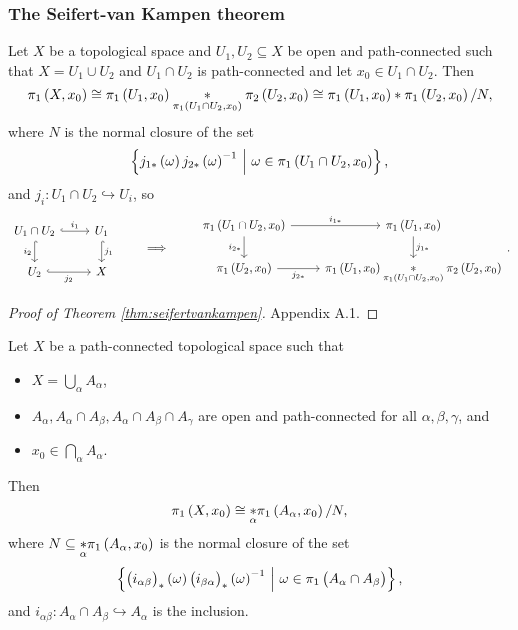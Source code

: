 \pagebreak

\subsubsection{The Seifert-van Kampen theorem}

\begin{theorem}
\label{thm:seifertvankampen}
Let $ X $ be a topological space and $ U_1, U_2 \subseteq X $ be open and path-connected such that $ X = U_1 \cup U_2 $ and $ U_1 \cap U_2 $ is path-connected and let $ x_0 \in U_1 \cap U_2 $. Then
$$ \pi_1\br{X, x_0} \cong \pi_1\br{U_1, x_0} \underset{\pi_1\br{U_1 \cap U_2, x_0}}{*} \pi_2\br{U_2, x_0} \cong \pi_1\br{U_1, x_0} * \pi_1\br{U_2, x_0} / N, $$
where $ N $ is the normal closure of the set
$$ \cbr{j_{1*}\br{\omega}j_{2*}\br{\omega}^{-1} \st \omega \in \pi_1\br{U_1 \cap U_2, x_0}}, $$
and $ j_i : U_1 \cap U_2 \hookrightarrow U_i $, so
$$
\begin{tikzcd}
U_1 \cap U_2 \arrow[hookrightarrow]{r}{i_1} \arrow[hookrightarrow]{d}[swap]{i_2} & U_1 \arrow[hookrightarrow]{d}{j_1} \\
U_2 \arrow[hookrightarrow]{r}[swap]{j_2} & X
\end{tikzcd}
\qquad \implies \qquad
\begin{tikzcd}
\pi_1\br{U_1 \cap U_2, x_0} \arrow{r}{i_{1*}} \arrow{d}[swap]{i_{2*}} & \pi_1\br{U_1, x_0} \arrow{d}{j_{1*}} \\
\pi_1\br{U_2, x_0} \arrow{r}[swap]{j_{2*}} & \pi_1\br{U_1, x_0} \underset{\pi_1\br{U_1 \cap U_2, x_0}}{*} \pi_2\br{U_2, x_0}
\end{tikzcd}.
$$
\end{theorem}

\begin{proof}[Proof of Theorem \ref{thm:seifertvankampen}]
Appendix A.1.
\end{proof}


\begin{theorem}
Let $ X $ be a path-connected topological space such that
\begin{itemize}
\item $ X = \bigcup_\alpha A_\alpha $,
\item $ A_\alpha, A_\alpha \cap A_\beta, A_\alpha \cap A_\beta \cap A_\gamma $ are open and path-connected for all $ \alpha, \beta, \gamma $, and
\item $ x_0 \in \bigcap_\alpha A_\alpha $.
\end{itemize}
Then
$$ \pi_1\br{X, x_0} \cong \underset{\alpha}{*} \pi_1\br{A_\alpha, x_0} / N, $$
where $ N \subseteq \underset{\alpha}{*} \pi_1\br{A_\alpha, x_0} $ is the normal closure of the set
$$ \cbr{\br{i_{\alpha\beta}}_*\br{\omega}\br{i_{\beta\alpha}}_*\br{\omega}^{-1} \st \omega \in \pi_1\br{A_\alpha \cap A_\beta}}, $$
and $ i_{\alpha\beta} : A_\alpha \cap A_\beta \hookrightarrow A_\alpha $ is the inclusion.
\end{theorem}

